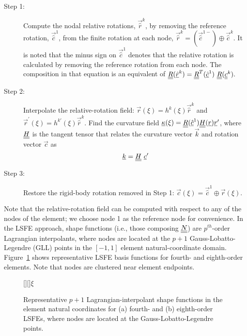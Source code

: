 \begin{description}

    \item[Step 1:] Compute the nodal relative rotations, $\vec{\hat{r}}^k$,
by removing the reference rotation, $\vec{\hat{c}}^1$, from the finite
rotation at each node, $\vec{\hat{r}}^k = (\vec{\hat{c}}^{1-}) \oplus
\vec{\hat{c}}^k$. It is noted that the minus sign on $\vec{\hat{c}}^1$ denotes that the relative rotation is calculated by removing the reference rotation from each node.  The composition in that equation is an equivalent of $\underline{\underline{R}}(\underline{\hat{r}}^k) = \underline{\underline{R}}^T(\underline{\hat{c}}^1)~\underline{\underline{R}}(\underline{\underline{c}}^k).$

    \item[Step 2:] Interpolate the relative-rotation field: $\vec{r}(\xi) = h^k(\xi) \vec{\hat{r}}^k$ and $\vec{r}^\prime(\xi) = h^{k \prime}(\xi) \vec{\hat{r}}^k$. Find the curvature field $\underline{\kappa}(\xi) = \underline{\underline{R}}(\underline{\hat{c}}^1) \underline{\underline{H}}(\underline{r}) \underline{r}^\prime$, where $\underline{\underline{H}}$ is the tangent tensor that relates the curvature vector $\vec{k}$ and rotation vector $\vec{c}$ as
\begin{equation}
    \label{Tensor}
    \underline{k} = \underline{\underline{H}}~ \underline{c}^\prime
\end{equation}

    \item[Step 3:] Restore the rigid-body rotation removed in Step 1: $\vec{c}(\xi) = \vec{\hat{c}}^1 \oplus \vec{r}(\xi)$.
\end{description} 


Note that the relative-rotation field can be computed with respect to any of
the nodes of the element; we choose node 1 as the reference node for
convenience. In the LSFE approach, shape functions (i.e., those composing $\underline{\underline{N}}$) are
$p^{th}$-order Lagrangian interpolants, where nodes are located at the $p+1$
Gauss-Lobatto-Legendre (GLL) points in the $[-1,1]$ element natural-coordinate domain.
Figure~\ref{fig:N4_lsfe} shows representative LSFE basis functions for  
fourth- and eighth-order elements.  Note that nodes are clustered near
element endpoints.

\begin{figure}[h]
    \centering
    [][]{$\xi$}
    \caption{Representative $p+1$ Lagrangian-interpolant shape functions in
the element natural coordinates for
(a) fourth- and (b) eighth-order LSFEs, where nodes are located at the
Gauss-Lobatto-Legendre points.}
    \label{fig:N4_lsfe}
\end{figure}

